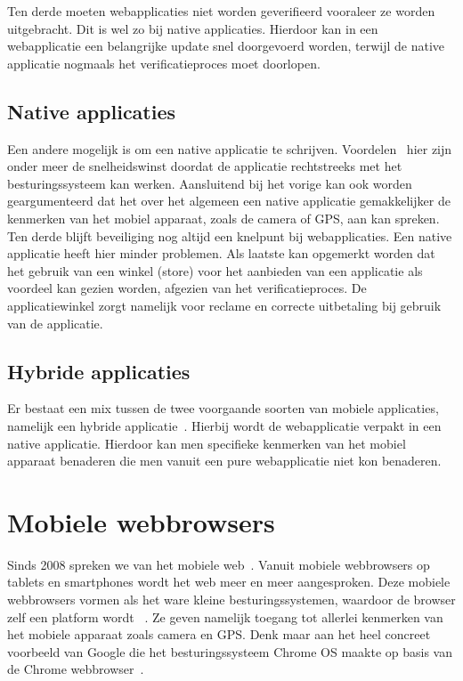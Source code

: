 Ten derde moeten webapplicaties niet worden geverifieerd vooraleer ze worden uitgebracht. Dit is wel zo bij native applicaties. Hierdoor kan in een webapplicatie een belangrijke update snel doorgevoerd worden, terwijl de native applicatie nogmaals het verificatieproces moet doorlopen.

\subsection{Native applicaties}
Een andere mogelijk is om een native applicatie te schrijven. Voordelen~\cite{Accenture2012} hier zijn onder meer de snelheidswinst doordat de applicatie rechtstreeks met het besturingssysteem kan werken. Aansluitend bij het vorige kan ook worden geargumenteerd dat het over het algemeen een native applicatie gemakkelijker de kenmerken van het mobiel apparaat, zoals de camera of GPS, aan kan spreken. Ten derde blijft beveiliging nog altijd een knelpunt bij webapplicaties. Een native applicatie heeft hier minder problemen. Als laatste kan opgemerkt worden dat het gebruik van een winkel (store) voor het aanbieden van een applicatie als voordeel kan gezien worden, afgezien van het verificatieproces. De applicatiewinkel zorgt namelijk voor reclame en correcte uitbetaling bij gebruik van de applicatie.

\subsection{Hybride applicaties}
Er bestaat een mix tussen de twee voorgaande soorten van mobiele applicaties, namelijk een hybride applicatie~\cite{Accenture2012}. Hierbij wordt de webapplicatie verpakt in een native applicatie. Hierdoor kan men specifieke kenmerken van het mobiel apparaat benaderen die men vanuit een pure webapplicatie niet kon benaderen.


\section{Mobiele webbrowsers}
\label{sec:mobiele-webbrowsers}
Sinds 2008 spreken we van het mobiele web~\cite{Hales2012}. Vanuit mobiele webbrowsers op tablets en smartphones wordt het web meer en meer aangesproken. Deze mobiele webbrowsers vormen als het ware kleine besturingssystemen, waardoor de browser zelf een platform wordt ~\cite{Hales2012}. Ze geven namelijk toegang tot allerlei kenmerken van het mobiele apparaat zoals camera en GPS. Denk maar aan het heel concreet voorbeeld van Google die het besturingssysteem Chrome OS maakte op basis van de Chrome webbrowser~\cite{Hales2012}.


